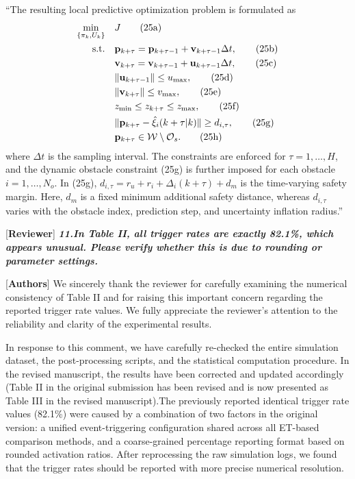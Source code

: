 \documentclass[12pt, twosides]{article}
\newcommand{\vect}[1]{\mathbf{#1}}
\theoremstyle{definition}
\begin{document}
``The resulting local predictive optimization problem is formulated as
\begin{subequations}
	\label{eq:opt_problem_rev}
	\renewcommand{\theequation}{25\alph{equation}}
	\begin{align}
		\min_{\{\pi_k, U_k\}} \quad & J \tag{25a} \\
		\text{s.t.} \quad & \vect{p}_{k+\tau} = \vect{p}_{k+\tau-1} + \vect{v}_{k+\tau-1}\Delta t, \tag{25b} \\
		& \vect{v}_{k+\tau} = \vect{v}_{k+\tau-1} + \vect{u}_{k+\tau-1}\Delta t, \tag{25c} \\
		& \|\vect{u}_{k+\tau-1}\| \le u_{\max}, \tag{25d} \\
		& \|\vect{v}_{k+\tau}\| \le v_{\max}, \tag{25e} \\
		& z_{\min} \le z_{k+\tau} \le z_{\max}, \tag{25f} \\
		& \|\vect{p}_{k+\tau} - \hat{\vect{\xi}}_{i}(k+\tau|k)\| \ge d_{i,\tau}, \tag{25g} \\
		& \vect{p}_{k+\tau} \in \mathcal{W} \setminus \mathcal{O}_s. \tag{25h}
	\end{align}
\end{subequations}
where $\Delta t$ is the sampling interval. The constraints are enforced for $\tau=1,\dots,H$, and the dynamic obstacle constraint (25g) is further imposed for each obstacle $i=1,\dots,N_o$. In (25g), $d_{i,\tau}=r_u+r_i+\Delta_i(k+\tau)+d_m$ is the time-varying safety margin. Here, $d_m$ is a fixed minimum additional safety distance, whereas $d_{i,\tau}$ varies with the obstacle index, prediction step, and uncertainty inflation radius.''

\textcolor[rgb]{0.00,0.00,1.00}{[\textbf {Reviewer}]} \textit{\textbf{11.In Table II, all trigger rates are exactly 82.1\%, which appears unusual. Please verify whether this is due to rounding or parameter settings.}}

\textcolor[rgb]{0.00,0.00,1.00}{[\textbf{Authors}]} We sincerely thank the reviewer for carefully examining the numerical consistency of Table II and for raising this important concern regarding the reported trigger rate values. We fully appreciate the reviewer's attention to the reliability and clarity of the experimental results.

In response to this comment, we have carefully re-checked the entire simulation dataset, the post-processing scripts, and the statistical computation procedure. In the revised manuscript, the results have been corrected and updated accordingly (Table II in the original submission has been revised and is now presented as Table III in the revised manuscript).The previously reported identical trigger rate values (82.1\%) were caused by a combination of two factors in the original version: a unified event-triggering configuration shared across all ET-based comparison methods, and a coarse-grained percentage reporting format based on rounded activation ratios. After reprocessing the raw simulation logs, we found that the trigger rates should be reported with more precise numerical resolution.
\end{document}
